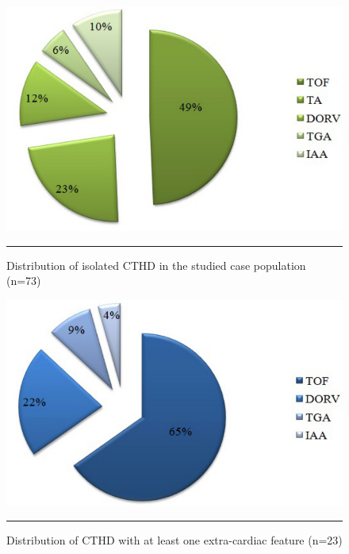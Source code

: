 \begin{refsection}
\begin{figure}[!thbp]
\centering
\includegraphics[scale=0.65,keepaspectratio]{Figures/Figure4_2pie.pdf}
\rule{35em}{0.5pt}
\caption{Distribution of isolated CTHD in the studied case population (n=73)}
\label{fig:4_2}
\end{figure}

\begin{figure}[!thbp]
\centering
\includegraphics[scale=0.65]{Figures/Figure4_3pie.pdf}
\rule{35em}{0.5pt}
\caption{Distribution of CTHD with at least one extra-cardiac feature (n=23)}
\label{fig:4_3}
\end{figure}


\end{refsection}
